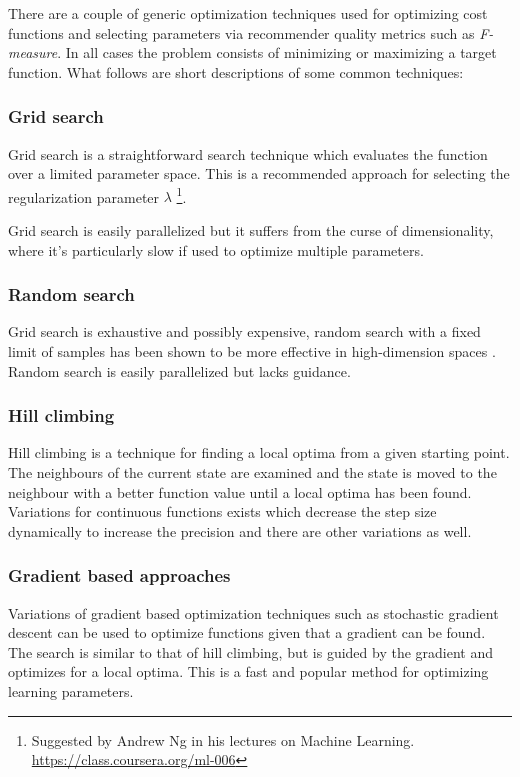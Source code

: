 There are a couple of generic optimization techniques used for optimizing cost functions and selecting parameters via recommender quality metrics such as \textit{F-measure}. In all cases the problem consists of minimizing or maximizing a target function. What follows are short descriptions of some common techniques:


\subsubsection{Grid search}

Grid search is a straightforward search technique which evaluates the function over a limited parameter space. This is a recommended approach for selecting the regularization parameter $\lambda$
\footnote{Suggested by Andrew Ng in his lectures on Machine Learning. \url{https://class.coursera.org/ml-006}}.

Grid search is easily parallelized but it suffers from the curse of dimensionality, where it's particularly slow if used to optimize multiple parameters.


\subsubsection{Random search}

Grid search is exhaustive and possibly expensive, random search with a fixed limit of samples has been shown to be more effective in high-dimension spaces \citep{bergstra2012random}. Random search is easily parallelized but lacks guidance.


\subsubsection{Hill climbing}

Hill climbing is a technique for finding a local optima from a given starting point. The neighbours of the current state are examined and the state is moved to the neighbour with a better function value until a local optima has been found. Variations for continuous functions exists which decrease the step size dynamically to increase the precision and there are other variations as well. \citep{norvigAI}


\subsubsection{Gradient based approaches}

Variations of gradient based optimization techniques such as stochastic gradient descent can be used to optimize functions given that a gradient can be found. The search is similar to that of hill climbing, but is guided by the gradient and optimizes for a local optima.  This is a fast and popular method for optimizing learning parameters.
\cite{hu2008collaborative}


